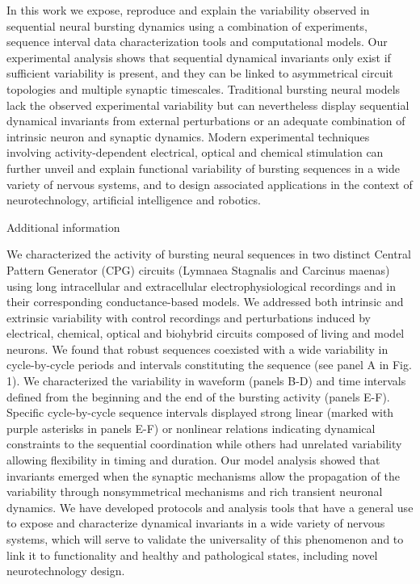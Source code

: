 In this work we expose, reproduce and explain the variability observed in sequential neural bursting dynamics using a combination of experiments, sequence interval data characterization tools and computational models. Our experimental analysis shows that sequential dynamical invariants only exist if sufficient variability is present, and they can be linked to asymmetrical circuit topologies and multiple synaptic timescales. Traditional bursting neural models lack the observed experimental variability but can nevertheless display sequential dynamical invariants from external perturbations or an adequate combination of intrinsic neuron and synaptic dynamics. Modern experimental techniques involving activity-dependent electrical, optical and chemical stimulation can further unveil and explain functional variability of bursting sequences in a wide variety of nervous systems, and to design associated applications in the context of neurotechnology, artificial intelligence and robotics.  

Additional information 

We characterized the activity of bursting neural sequences in two distinct Central Pattern Generator (CPG) circuits (Lymnaea Stagnalis and Carcinus maenas) using long intracellular and extracellular electrophysiological recordings and in their corresponding conductance-based models. We addressed both intrinsic and extrinsic variability with control recordings and perturbations induced by electrical, chemical, optical and biohybrid circuits composed of living and model neurons. We found that robust sequences coexisted with a wide variability in cycle-by-cycle periods and intervals constituting the sequence (see panel A in Fig. 1). We characterized the variability in waveform (panels B-D) and time intervals defined from the beginning and the end of the bursting activity (panels E-F). Specific cycle-by-cycle sequence intervals displayed strong linear (marked with purple asterisks in panels E-F) or nonlinear relations indicating dynamical constraints to the sequential coordination while others had unrelated variability allowing flexibility in timing and duration. Our model analysis showed that invariants emerged when the synaptic mechanisms allow the propagation of the variability through nonsymmetrical mechanisms and rich transient neuronal dynamics. We have developed protocols and analysis tools that have a general use to expose and characterize dynamical invariants in a wide variety of nervous systems, which will serve to validate the universality of this phenomenon and to link it to functionality and healthy and pathological states, including novel neurotechnology design. 

